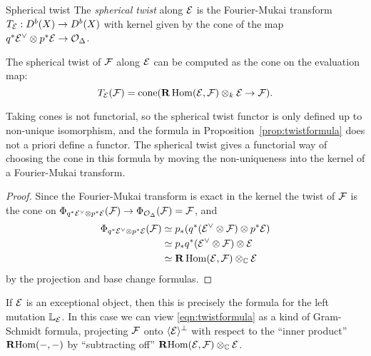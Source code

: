 \begin{definition}{Spherical twist}{}
    The \emph{spherical twist} along $\mathcal{E}$ is the Fourier-Mukai transform
    $T_{\mathcal{E}}:D^b(X)\to D^b(X)$ with kernel given by the cone of the map
    $q^*\mathcal{E}^\vee\otimes p^*\mathcal{E}\to\mathcal{O}_\Delta$.
\end{definition}

\begin{proposition}[label=prop:twistformula]{}{}
    The spherical twist of $\mathcal{F}$ along $\mathcal{E}$ can be computed as the cone on
    the evaluation map:
    \begin{equation}\label{eqn:twistformula}
        T_{\mathcal{E}}(\mathcal{F})=\operatorname{cone}(\mathbf{R}\operatorname{Hom}(\mathcal{E},\mathcal{F})\otimes_k\mathcal{E}\to\mathcal{F}).
    \end{equation}
\end{proposition}

\begin{remark}{}{}
    Taking cones is not functorial, so the spherical twist functor is only
    defined up to non-unique isomorphism, and the formula in
    Proposition~\ref{prop:twistformula} does not a priori define a functor. The
    spherical twist gives a functorial way of choosing the cone in this formula
    by moving the non-uniqueness into the kernel of a Fourier-Mukai transform.
\end{remark}

\begin{proof}
    Since the Fourier-Mukai transform is exact in the kernel the twist of
    $\mathcal{F}$ is the cone on $\Phi_{q^*\mathcal{E}^\vee\otimes p^*\mathcal{E}}(\mathcal{F})
    \to\Phi_{\mathcal{O}_\Delta}(\mathcal{F})=\mathcal{F}$, and
    \begin{align*}
        \Phi_{q^*\mathcal{E}^\vee\otimes p^*\mathcal{E}}(\mathcal{F})
            &\simeq p_*(q^*(\mathcal{E}^\vee\otimes\mathcal{F})\otimes p^*\mathcal{E}) \\
            &\simeq p_*q^*(\mathcal{E}^\vee\otimes\mathcal{F})\otimes\mathcal{E} \\
            &\simeq \mathbf{R}\operatorname{Hom}(\mathcal{E},\mathcal{F})\otimes_{\mathbb{C}}\mathcal{E}
    \end{align*}
    by the projection and base change formulas.
\end{proof}

\begin{remark}{}{}
    If $\mathcal{E}$ is an exceptional object, then this is precisely the formula for
    the left mutation $\mathbb{L}_{\mathcal{E}}$. In this case we can view
    \eqref{eqn:twistformula} as a kind of Gram-Schmidt formula, projecting
    $\mathcal{F}$ onto $\langle\mathcal{E}\rangle^\perp$ with respect to the ``inner
    product'' $\operatorname{\mathbf{R} Hom}(-,-)$ by ``subtracting off''
    $\operatorname{\mathbf{R} Hom}(\mathcal{E},\mathcal{F})\otimes_{\mathbb{C}}\mathcal{E}$.
\end{remark}

